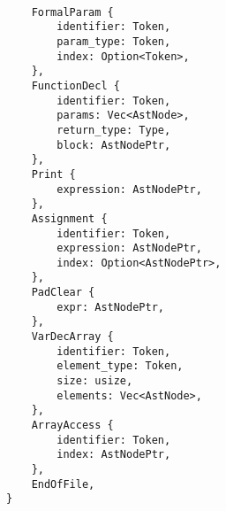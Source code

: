 \begin{mainbox}{}
    \lstset{xleftmargin=0cm}
    \begin{lstlisting}

    FormalParam {
        identifier: Token,
        param_type: Token,
        index: Option<Token>,
    },
    FunctionDecl {
        identifier: Token,
        params: Vec<AstNode>,
        return_type: Type,
        block: AstNodePtr,
    },
    Print {
        expression: AstNodePtr,
    },
    Assignment {
        identifier: Token,
        expression: AstNodePtr,
        index: Option<AstNodePtr>,
    },
    PadClear {
        expr: AstNodePtr,
    },
    VarDecArray {
        identifier: Token,
        element_type: Token,
        size: usize,
        elements: Vec<AstNode>,
    },
    ArrayAccess {
        identifier: Token,
        index: AstNodePtr,
    },
    EndOfFile,
}
    \end{lstlisting}
\end{mainbox}
